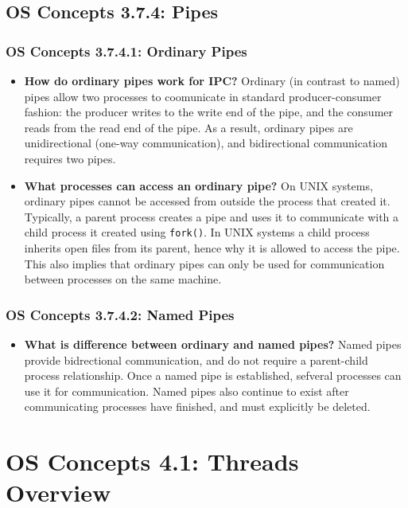 \documentclass[12pt]{article}
\begin{document}
\subsection*{OS Concepts 3.7.4: Pipes}

\subsubsection*{OS Concepts 3.7.4.1: Ordinary Pipes}

\begin{itemize}
    \item \textbf{How do ordinary pipes work for IPC?} Ordinary (in contrast to named) pipes allow two processes to coomunicate in standard producer-consumer fashion: the producer writes to the write end of the pipe, and the consumer reads from the read end of the pipe. As a result, ordinary pipes are unidirectional (one-way communication), and bidirectional communication requires two pipes.
    \item \textbf{What processes can access an ordinary pipe?} On UNIX systems, ordinary pipes cannot be accessed from outside the process that created it. Typically, a parent process creates a pipe and uses it to communicate with a child process it created using \texttt{fork()}. In UNIX systems a child process inherits open files from its parent, hence why it is allowed to access the pipe. This also implies that ordinary pipes can only be used for communication between processes on the same machine.
\end{itemize}

\subsubsection*{OS Concepts 3.7.4.2: Named Pipes}

\begin{itemize}
    \item \textbf{What is difference between ordinary and named pipes?} Named pipes provide bidrectional communication, and do not require a parent-child process relationship. Once a named pipe is established, sefveral processes can use it for communication. Named pipes also continue to exist after communicating processes have finished, and must explicitly be deleted.
\end{itemize}

\section*{OS Concepts 4.1: Threads Overview}
\end{document}
